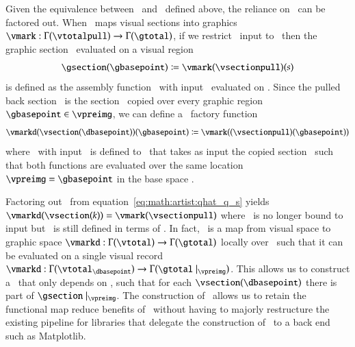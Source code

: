\documentclass[journal]{vgtc}                %
\begin{document}
Given the equivalence between \vsection\ and \vsectionpull\ defined above, the reliance on \gbase\ can be factored out. When \vmark\ maps visual sections into graphics $\vmark: \Gamma(\vtotalpull) \rightarrow \Gamma(\gtotal)$, if we restrict \vmark\ input to \vsectionpull\ then the graphic section \gsection\ evaluated on a visual region \gbasepoint\
\begin{equation}
    \gsection(\gbasepoint) \coloneqq \vmark(\vsectionpull)(s)
    \label{eq:math:artist:qhat}
\end{equation}
 is defined as the assembly function \vmark\ with input \vsectionpull\ evaluated on \gbasepoint. Since the pulled back section \vsectionpull\ is the section \vsection\ copied over every graphic region $\gbasepoint \in \vpreimg$, we can define a \vmark\ factory function 
\begin{equation}
\label{eq:math:artist:qhat_q_s}
\vmarkd(\vsection(\dbasepoint))(\gbasepoint) \coloneqq \vmark((\vsectionpull)(\gbasepoint))
\end{equation} 
where \vmarkd\ with input \vsection\ is defined to \vmark\ that takes as input the copied section \vsectionpull\ such that both functions are evaluated over the same location $\vpreimg = \gbasepoint$ in the base space \gbase. 

Factoring out \gbasepoint\ from equation~\ref{eq:math:artist:qhat_q_s} yields $\vmarkd(\vsection(k)) = \vmark(\vsectionpull)$ where \vmark\ is no longer bound to input but \vmarkd\ is still defined in terms of \dbase. In fact, \vmarkd\ is a map from visual space to graphic space $\vmarkd:\Gamma(\vtotal) \rightarrow \Gamma(\gtotal)$ locally over \dbasepoint\ such that it can be evaluated on a single visual record  $\vmarkd:\Gamma(\vtotal_{\dbasepoint}) \rightarrow \Gamma(\gtotal\mid_{\vpreimg})$. This allows us to construct a \vmarkd\ that only depends on \dbase, such that for each $\vsection(\dbasepoint)$ there is part of $\gsection\mid_{\vpreimg}$. The construction of \vmarkd\ allows us to retain the functional map reduce benefits of \vmark\ without having to majorly restructure the existing pipeline for libraries that delegate the construction of \gsection\ to a back end such as Matplotlib.
\end{document}
